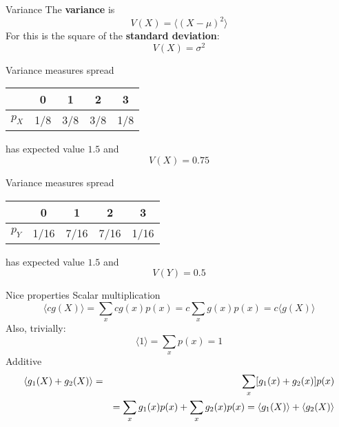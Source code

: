 \documentclass{beamer}
\newcommand{\crish}{\color{reddish}}
\newcommand{\cbla}{\color{black}}
\begin{document}

\begin{frame}{Variance}
  The \textbf{variance} is
\crish$$
V(X)=\langle (X-\mu)^2\rangle
$$\cbla{}
For this is the square of the
\textbf{standard deviation}:
\crish$$V(X)=\sigma^2$$\cbla{}
\end{frame}

\begin{frame}{Variance measures spread}
\color{purple}
  \begin{center}
\begin{tabular}{c|cccc}
&0&1&2&3\\
\hline
$p_X$&1/8&3/8&3/8&1/8
\end{tabular}
\end{center}
  \cbla{}
  has expected value \crish$1.5$\cbla{} and
  \crish$$
  V(X)=0.75
  $$\cbla{}
\end{frame}


\begin{frame}{Variance measures spread}
\color{purple}
  \begin{center}
\begin{tabular}{c|cccc}
&0&1&2&3\\
  \hline
  $p_Y$&1/16&7/16&7/16&1/16
\end{tabular}
\end{center}
  \cbla{}
  has expected value \crish$1.5$\cbla{} and
  \crish$$
  V(Y)=0.5
  $$\cbla{}
\end{frame}

\begin{frame}{Nice properties}
  Scalar multiplication
\crish$$
    \langle c g(X)\rangle =\sum_x cg(x)p(x)=c\sum_x g(x)p(x)=c\langle g(X)\rangle
$$\cbla{}
Also, trivially:
\crish$$
\langle 1\rangle=\sum_x p(x)=1
$$\cbla{}
Additive
\crish
\begin{eqnarray*}
\langle g_1(X)+g_2(X)\rangle &=&\sum_x [g_1(x)+g_2(x)]p(x)\cr
&&=\sum_x g_1(x)p(x)+\sum_x g_2(x)p(x)=\langle g_1(X)\rangle+\langle g_2(X)\rangle
\end{eqnarray*}
\cbla{} 
\end{frame}
\end{document}
